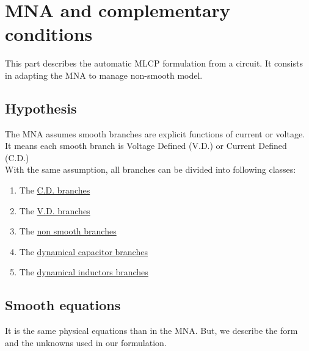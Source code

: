  
\section{MNA and complementary conditions\\}
This part describes the automatic MLCP formulation from a circuit. It consists in adapting the
MNA to manage non-smooth model.

\subsection{Hypothesis\\}
The MNA assumes smooth branches are explicit functions of current or voltage. It means each smooth
branch is Voltage Defined (V.D.) or Current Defined (C.D.)\\

With the same assumption, all branches can be divided into following classes:\\
\begin{enumerate}
\item The  \underline{C.D. branches} 
\item The  \underline{V.D. branches}
 \item The  \underline{non smooth branches}
 \item The \underline{dynamical capacitor branches}
 \item The \underline{dynamical inductors branches}
\end{enumerate}

\subsection{Smooth equations\\}
It is the same physical equations than in the MNA. But, we describe the form and the unknowns
used in our formulation.
